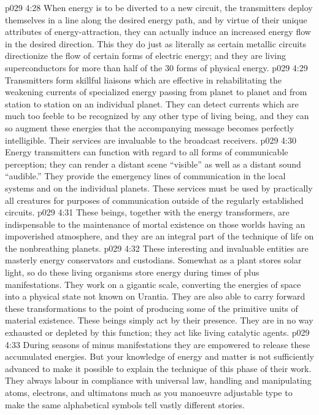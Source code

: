 \vs p029 4:28 When energy is to be diverted to a new circuit, the transmitters deploy themselves in a line along the desired energy path, and by virtue of their unique attributes of energy\hyp{}attraction, they can actually induce an increased energy flow in the desired direction. This they do just as literally as certain metallic circuits directionize the flow of certain forms of electric energy; and they are living superconductors for more than half of the 30 forms of physical energy.
\vs p029 4:29 Transmitters form skillful liaisons which are effective in rehabilitating the weakening currents of specialized energy passing from planet to planet and from station to station on an individual planet. They can detect currents which are much too feeble to be recognized by any other type of living being, and they can so augment these energies that the accompanying message becomes perfectly intelligible. Their services are invaluable to the broadcast receivers.
\vs p029 4:30 Energy transmitters can function with regard to all forms of communicable perception; they can render a distant scene “visible” as well as a distant sound “audible.” They provide the emergency lines of communication in the local systems and on the individual planets. These services must be used by practically all creatures for purposes of communication outside of the regularly established circuits.
\vs p029 4:31 These beings, together with the energy transformers, are indispensable to the maintenance of mortal existence on those worlds having an impoverished atmosphere, and they are an integral part of the technique of life on the nonbreathing planets.
\vs p029 4:32 \bibnobreakspace {} These interesting and invaluable entities are masterly energy conservators and custodians. Somewhat as a plant stores solar light, so do these living organisms store energy during times of plus manifestations. They work on a gigantic scale, converting the energies of space into a physical state not known on Urantia. They are also able to carry forward these transformations to the point of producing some of the primitive units of material existence. These beings simply act by their presence. They are in no way exhausted or depleted by this function; they act like living catalytic agents.
\vs p029 4:33 During seasons of minus manifestations they are empowered to release these accumulated energies. But your knowledge of energy and matter is not sufficiently advanced to make it possible to explain the technique of this phase of their work. They always labour in compliance with universal law, handling and manipulating atoms, electrons, and ultimatons much as you manoeuvre adjustable type to make the same alphabetical symbols tell vastly different stories.
